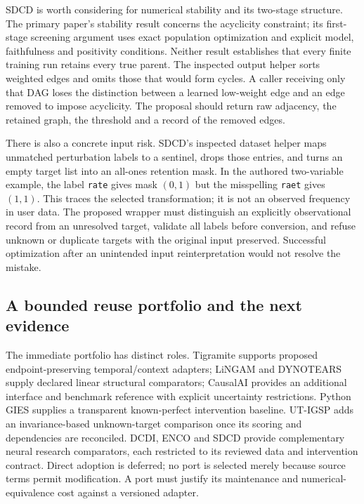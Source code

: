 SDCD is worth considering for numerical stability and its two-stage
structure. The primary paper's stability result concerns the acyclicity
constraint; its first-stage screening argument uses exact population
optimization and explicit model, faithfulness and positivity conditions.
Neither result establishes that every finite training run retains every
true parent. The inspected output helper sorts weighted edges and omits
those that would form cycles. A caller receiving only that DAG loses the
distinction between a learned low-weight edge and an edge removed to impose
acyclicity. The proposal should return raw adjacency, the retained graph,
the threshold and a record of the removed edges.
\citep{exec14_pt_paper_sdcd,exec14_pt_sdcd}

There is also a concrete input risk. SDCD's inspected dataset helper maps
unmatched perturbation labels to a sentinel, drops those entries, and
turns an empty target list into an all-ones retention mask. In the authored
two-variable example, the label \texttt{rate} gives mask $(0,1)$ but the
misspelling \texttt{raet} gives $(1,1)$. This traces the selected transformation;
it is not an observed frequency in user data. The proposed wrapper must
distinguish an explicitly observational record from an unresolved target,
validate all labels before conversion, and refuse unknown or duplicate
targets with the original input preserved. Successful optimization after
an unintended input reinterpretation would not resolve the mistake.
\citep{exec14_pt_sdcd,exec14_pt_exact}

\subsection{A bounded reuse portfolio and the next evidence}

The immediate portfolio has distinct roles. Tigramite supports proposed
endpoint-preserving temporal/context adapters; LiNGAM and DYNOTEARS supply
declared linear structural comparators; CausalAI provides an additional
interface and benchmark reference with explicit uncertainty restrictions.
Python GIES supplies a transparent known-perfect intervention baseline.
UT-IGSP adds an invariance-based unknown-target comparison once its scoring
and dependencies are reconciled. DCDI, ENCO and SDCD provide complementary
neural research comparators, each restricted to its reviewed data and
intervention contract. Direct adoption is deferred; no port is selected
merely because source terms permit modification. A port must justify its
maintenance and numerical-equivalence cost against a versioned adapter.
\citep{exec14_pt_contract}


